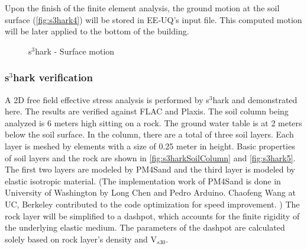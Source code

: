 Upon the finish of the finite element analysis, the ground motion at the soil surface (\autoref{fig:s3hark4}) will be stored in EE-UQ's input file.
This computed motion will be later applied to the bottom of the building.

\begin{figure}[!htbp]
  \caption{s$^3$hark - Surface motion }
  \label{fig:s3hark4}
\end{figure}




\subsubsection{s$^3$hark verification}

A 2D free field effective stress analysis is performed by s$^3$hark and demonstrated here. 
The results are verified against FLAC and Plaxis. 
The soil column being analyzed is 6 meters high sitting on a rock.
The ground water table is at 2 meters below the soil surface.
In the column, there are a total of three soil layers. Each layer is meshed by elements with a size of 0.25 meter in height.
Basic properties of soil layers and the rock are shown in \autoref{fig:s3harkSoilColumn} and \autoref{fig:s3hark5}.
The first two layers are modeled by PM4Sand and the third layer is modeled by elastic isotropic material. 
(The implementation work of PM4Sand \cite{boulanger2015pm4sand} is done in University of Washington by Long Chen and Pedro Arduino.
Chaofeng Wang at UC, Berkeley contributed to the code optimization for speed improvement. )
The rock layer will be simplified to a \cite{Lysmer:1969}  dashpot, which accounts for the finite rigidity of the underlying elastic medium.
The parameters of the dashpot are calculated solely based on rock layer's density and V$_{s30}$.


